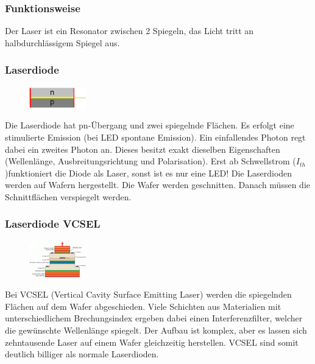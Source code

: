 \subsubsection{Funktionsweise}
Der Laser ist ein Resonator zwischen 2 Spiegeln, das Licht tritt an halbdurchlässigem Spiegel aus.

\subsubsection{Laserdiode}
\begin{figure}
    \centering
    \includegraphics[width=0.22\textwidth]{images/laserdiode}
\end{figure}
Die Laserdiode hat pn-Übergang und zwei spiegelnde Flächen. Es erfolgt eine stimulierte Emission (bei LED spontane Emission). Ein einfallendes Photon regt dabei ein zweites Photon an. Dieses besitzt exakt dieselben Eigenschaften (Wellenlänge, Ausbreitungsrichtung und Polarisation). Erst ab Schwellstrom ($I_{th}$)funktioniert die Diode als Laser, sonst ist es nur eine LED! Die Laserdioden werden auf Wafern hergestellt. Die Wafer werden geschnitten. Danach müssen die Schnittflächen verspiegelt werden. 

\subsubsection{Laserdiode VCSEL}
\begin{figure}
    \centering
    \includegraphics[width=0.22\textwidth]{images/vcsel}
\end{figure}
Bei VCSEL (Vertical Cavity Surface Emitting Laser) werden die spiegelnden Flächen auf dem Wafer abgeschieden. Viele Schichten aus Materialien mit unterschiedlichem Brechungsindex ergeben dabei einen Interferenzfilter, welcher die gewünschte Wellenlänge spiegelt. Der Aufbau ist komplex, aber es lassen sich zehntausende Laser auf einem Wafer gleichzeitig herstellen. VCSEL sind somit deutlich billiger als normale Laserdioden.





